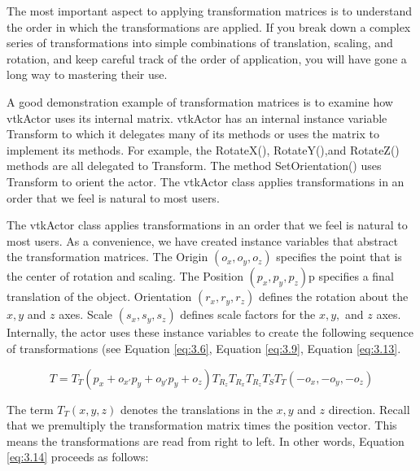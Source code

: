 The most important aspect to applying transformation matrices is to understand the order in which the transformations are applied. If you break down a complex series of transformations into simple combinations of translation, scaling, and rotation, and keep careful track of the order of application, you will have gone a long way to mastering their use.

A good demonstration example of transformation matrices is to examine how vtkActor uses its internal matrix. vtkActor has an internal instance variable Transform to which it delegates many of its methods or uses the matrix to implement its methods. For example, the RotateX(), RotateY(),and RotateZ() methods are all delegated to Transform. The method SetOrientation() uses Transform to orient the actor. The vtkActor class applies transformations in an order that we feel is natural to most users.

The vtkActor class applies transformations in an order that we feel is natural to most users. As a convenience, we have created instance variables that abstract the transformation matrices. The Origin $(o_x,o_y,o_z)$ specifies the point that is the center of rotation and scaling. The Position $(p_x, p_y, p_z)$p specifies a final translation of the object. Orientation $(r_x, r_y, r_z)$ defines the rotation about the $x, y$ and $z$ axes. Scale $(s_x, s_y, s_z)$ defines scale factors for the $x, y,$ and $z$ axes. Internally, the actor uses these instance variables to create the following sequence of transformations (see Equation \eqref{eq:3.6}, Equation \eqref{eq:3.9},  Equation \eqref{eq:3.13}.

\begin{equation}\label{eq:3.14}
T = T_T(p_x + o_{x'}p_y + o_{y'}p_y + o_z)T_{R_z}T_{R_x}T_{R_z}T_ST_T(-o_x,-o_y,-o_z)
\end{equation}

\noindent The term $T_T(x, y, z)$ denotes the translations in the $x,y$ and $z$ direction. Recall that we premultiply the transformation matrix times the position vector. This means the transformations are read from right to left. In other words, Equation \eqref{eq:3.14} proceeds as follows:


